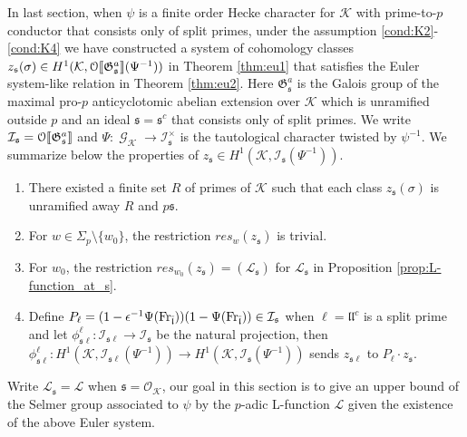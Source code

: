 \documentclass[leqno]{amsart}
\theoremstyle{definition}
\theoremstyle{remark}
\newcommand{\oo}{\mathcal{O}}
\newcommand{\eo}{\EuScript{O}}
\DeclareMathOperator{\Gal}{\mathcal{G}}
\newcommand{\Fr}{\textnormal{Fr}} %
\newcommand{\fl}{\mathfrak{l}}
\newcommand{\fs}{\mathfrak{s}}
\newcommand{\K}{{\mathcal{K}}} %
\newcommand{\fG}{\mathfrak{G}}
\newcommand{\I}{\mathcal{I}} %
\begin{document}
In last section,
when $\psi$ is a finite order Hecke character for $\K$
with prime-to-$p$ conductor that consists only of split primes,
under the assumption \ref{cond:K2}-\ref{cond:K4}
we have constructed a system of cohomology
classes $z_\fs(\sigma)\in H^1(\K,\eo\llbracket\fG_\fs^a\rrbracket(\Psi^{-1}))$
in Theorem \ref{thm:eu1}
that satisfies the Euler system-like relation
in Theorem \ref{thm:eu2}.
Here $\fG_\fs^a$ is the Galois group of the maximal pro-$p$
anticyclotomic abelian extension over $\K$
which is unramified outside $p$
and an ideal $\fs=\fs^c$ that consists only 
of split primes.
We write $\I_\fs=\eo\llbracket\fG_\fs^a\rrbracket$
and $\Psi\colon\Gal_\K\to\I_\fs^\times$
is the tautological character twisted by $\psi^{-1}$.
We summarize below the properties of
$z_\fs\in H^1(\K,\I_\fs(\Psi^{-1}))$.
\begin{enumerate}
    \item There existed a finite set $R$ of primes of $\K$
    such that each class $z_\fs(\sigma)$ is unramified 
    away $R$ and $p\fs$.
    \item For $w\in \Sigma_p\setminus\{w_0\}$,
    the restriction $res_{w}(z_\fs)$ is trivial.
    \item For $w_0$,
    the restriction $res_{w_0}(z_\fs)=(\mathcal{L}_{\fs})$
    for $\mathcal{L}_\fs$ in Proposition \ref{prop:L-function_at_s}.
    \item Define $P_\ell=(1-\epsilon^{-1}\Psi(\Fr_{\bar{\fl}}))
    (1-\Psi(\Fr_{\bar{\fl}}))\in\I_\fs$
    when $\ell=\fl\fl^c$ is a split prime
    and let $\phi_{\fs\ell}^\ell\colon \I_{\fs\ell}\to \I_\fs$
    be the natural projection, then 
    $\phi_{\fs\ell}^{\ell}\colon
	H^1(\K,\I_{\fs\ell}(\Psi^{-1}))\to H^1(\K,\I_\fs(\Psi^{-1}))$
    sends $z_{\fs\ell}$ to $P_\ell\cdot z_\fs$.
\end{enumerate}
Write $\mathcal{L}_\fs=\mathcal{L}$
when $\fs=\oo_\K$,
our goal in this section is
to give an upper bound of the Selmer group
associated to $\psi$ by the $p$-adic L-function $\mathcal{L}$
given the existence of the above Euler system.
\end{document}
